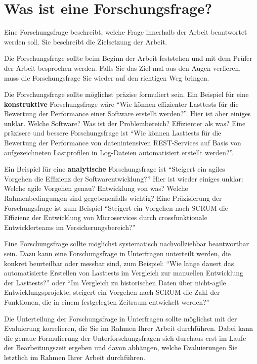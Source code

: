 \section{Was ist eine Forschungsfrage?}

Eine Forschungsfrage beschreibt, welche Frage innerhalb der Arbeit beantwortet werden soll. Sie beschreibt die Zielsetzung der Arbeit. 

Die Forschungsfrage sollte beim Beginn der Arbeit feststehen und mit dem Prüfer der Arbeit besprochen werden. Falls Sie das Ziel mal aus den Augen verlieren, muss die Forschungsfrage Sie wieder auf den richtigen Weg bringen.

Die Forschungsfrage sollte möglichst präzise formuliert sein. Ein Beispiel für eine \textbf{konstruktive} Forschungsfrage wäre \enquote{Wie können effizienter Lasttests für die Bewertung der Performance einer Software erstellt werden?}. Hier ist aber einiges unklar. Welche Software? Was ist der Problembereich? Effizienter als was? Eine präzisere und bessere Forschungsfrage ist \enquote{Wie können Lasttests für die Bewertung der Performance von datenintensiven REST-Services auf Basis von aufgezeichneten Lastprofilen in Log-Dateien automatisiert erstellt werden?}.

Ein Beispiel für eine \textbf{analytische} Forschungsfrage ist \enquote{Steigert ein agiles Vorgehen die Effizienz der Softwarentwicklung?} Hier ist wieder einiges unklar: Welche agile Vorgehen genau? Entwicklung von was? Welche Rahmenbedingungen sind gegebenenfalls wichtig? Eine Präzisierung der Forschungsfrage ist zum Beispiel \enquote{Steigert ein Vorgehen nach SCRUM die Effizienz der Entwicklung von Microservices durch crossfunktionale Entwicklerteams im Versicherungsbereich?}

Eine Forschungsfrage sollte möglichst systematisch nachvollziehbar beantwortbar sein. Dazu kann eine Forschungsfrage in Unterfragen unterteilt werden, die konkret beurteilbar oder messbar sind, zum Beispiel: \enquote{Wie lange dauert das automatisierte Erstellen von Lasttests im Vergleich zur manuellen Entwicklung der Lasttests?} oder \enquote{Im Vergleich zu historischen Daten über nicht-agile Entwicklungsprojekte, steigert ein Vorgehen nach SCRUM die Zahl der Funktionen, die in einem festgelegten Zeitraum entwickelt werden?}

Die Unterteilung der Forschungsfrage in Unterfragen sollte möglichst mit der Evaluierung korrelieren, die Sie im Rahmen Ihrer Arbeit durchführen. Dabei kann die genaue Formulierung der Unterforschungsfragen sich durchaus erst im Laufe der Bearbeitungszeit ergeben und davon abhängen, welche Evaluierungen Sie letztlich im Rahmen Ihrer Arbeit durchführen.

